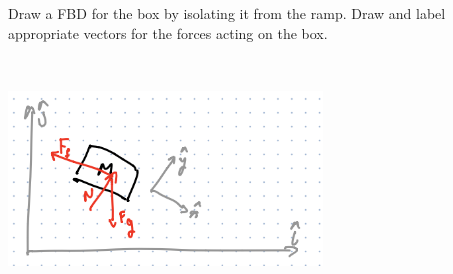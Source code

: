 Draw a FBD for the box by isolating it from the ramp. Draw and label appropriate vectors for the forces acting on the box.

\begin{solution}\
\begin{center}
    \includegraphics[width=0.625\textwidth]{img/e10p1.png}
\end{center}
\end{solution}